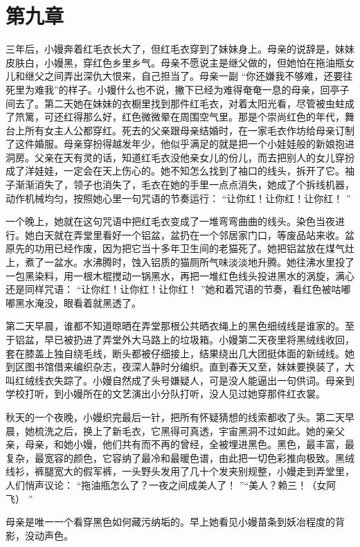 \documentclass[12pt,twoside,openany]{book}
\begin{document}
\chapter{第九章}

三年后，小嫚奔着红毛衣长大了，但红毛衣穿到了妹妹身上。母亲的说辞是，妹妹皮肤白，小嫚黑，穿红色乡里乡气。母亲不愿说主是继父做的，但她怕在拖油瓶女儿和继父之间弄出深仇大恨来，自己担当了。母亲一副 “你还嫌我不够难，还要往死里为难我”的样子。小嫚什么也不说，撇下已经为难得奄奄一息的母亲，回亭子间去了。第二天她在妹妹的衣橱里找到那件红毛衣，对着太阳光看，尽管被虫蛀成了笊篱，可还红得那么好，红色微微晕在周围空气里。那是个崇尚红色的年代，舞台上所有女主人公都穿红。死去的父亲跟母亲结婚时，在一家毛衣作坊给母亲订制了这件婚服。母亲穿扮得越发年少，他似乎满足的就是把一个小娃娃般的新娘抱进洞房。父亲在天有灵的话，知道红毛衣没他亲女儿的份儿，而去把别人的女儿穿扮成了洋娃娃，一定会在天上伤心的。她不知怎么找到了袖口的线头，拆开了它。袖子渐渐消失了，领子也消失了，毛衣在她的手里一点点消失，她成了个拆线机器，动作机械均匀，按照她心里一句咒语的节奏运行： “让你红！让你红！让你红！ ”

一个晚上，她就在这句咒语中把红毛衣变成了一堆弯弯曲曲的线头。染色当夜进行。她白天就在弄堂里看好一个铝盆，盆扔在一个邻居家门口，等废品站来收。盆原先的功用已经作废，因为把它当十多年卫生间的老猫死了。她把铝盆放在煤气灶上，煮了一盆水。水沸腾时，蚀入铝质的猫厕所气味淡淡地升腾。她往沸水里投了一包黑染料，用一根木棍搅动一锅黑水，再把一堆红色线头投进黑水的涡旋，满心还是同样咒语： “让你红！让你红！让你红！ ”她和着咒语的节奏，看红色被咕嘟嘟黑水淹没，眼看着就黑透了。

第二天早晨，谁都不知道晾晒在弄堂那根公共晒衣绳上的黑色细绒线是谁家的。至于铝盆，早已被扔进了弄堂外大马路上的垃圾箱。小嫚第二天夜里将黑绒线收回，套在膝盖上独自绕毛线，断头都被仔细接上，结果绕出几大团挺体面的新绒线。她到区图书馆借来编织杂志，夜深人静时分编织。直到春天又至，妹妹要换装了，大叫红绒线衣失踪了。小嫚自然成了头号嫌疑人，可是没人能逼出一句供词。母亲到学校打听，到小嫚所在的文艺演出小分队打听，没人见过她穿那件红衣裳。

秋天的一个夜晚，小嫚织完最后一针，把所有怀疑猜想的线索都收了头。第二天早晨，她梳洗之后，换上了新毛衣，它黑得可真透，宇宙黑洞不过如此。她的亲父亲，母亲，和她小嫚，他们共有而不再的曾经，全被埋进黑色。黑色，最丰富，最复杂，最宽容的颜色，它容纳了最冷和最暖色谱，由此把一切色彩推向极致。黑绒线衫，裤腿宽大的假军裤，一头野头发用了几十个发夹别规整，小嫚走到弄堂里，人们悄声议论： “拖油瓶怎么了？一夜之间成美人了！ ”“美人？赖三！（女阿飞） ”

母亲是唯一一个看穿黑色如何藏污纳垢的。早上她看见小嫚苗条到妖冶程度的背影，没动声色。
\end{document}
